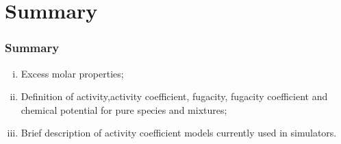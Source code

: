 \documentclass[10pt,compress,handout,ignorenonframetext]{beamer}
\begin{document}
\section{Summary}

\begin{frame}
 \frametitle{Summary}
   \begin{enumerate}[(i)]
     \item Excess molar properties;
     \item Definition of activity,activity coefficient, fugacity, fugacity coefficient and chemical potential for pure species and mixtures;
     \item Brief description of activity coefficient models currently used in simulators.
   \end{enumerate}
\end{frame}
\end{document}
